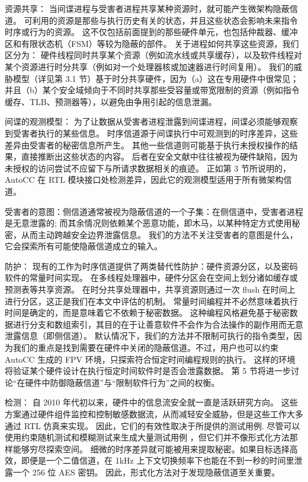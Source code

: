 资源共享： 当间谍进程与受害者进程共享某种资源时，就可能产生微架构隐蔽信道。
可利用的资源是那些与执行历史有关的状态，并且这些状态会影响未来指令时序或行为的资源。
这不仅包括前面提到的那些硬件单元，也包括仲裁器、缓冲区和有限状态机（FSM）等较为隐蔽的部件。
关于进程如何共享这些资源，我们区分为：
硬件线程同时共享某个资源（例如流水线或共享缓存），以及软件线程对某个资源进行时分共享（例如对一个处理器核或加速器进行时间复用）。
我们的威胁模型（详见第 3.1 节）基于时分共享硬件，因为（a）这在专用硬件中很常见；
并且（b）某个安全域倾向于不同时共享那些受容量或带宽限制的资源（例如指令缓存、TLB、预测器等），以避免由争用引起的信息泄漏。

间谍的观测模型： 为了让数据从受害者进程泄露到间谍进程，间谍必须能够观察到受害者执行的某些信息。
时序信道源于间谍执行中可观测到的时序差异，这些差异由受害者的秘密信息所产生。
其他一些信道则可能基于执行未授权操作的结果，直接推断出这些状态的内容。
后者在安全文献中往往被视为硬件缺陷，因为未授权的访问尝试不应留下与所请求数据相关的痕迹。
正如第 3 节所说明的，AutoCC 在 RTL 模块接口处检测差异，因此它的观测模型适用于所有微架构信道。

受害者的意图：侧信道通常被视为隐蔽信道的一个子集：在侧信道中，受害者进程是无意泄露的;
而其余情况则依赖某个恶意功能，即木马，以某种特定方式使用秘密，从而主动跨越安全边界泄露信息。
我们的方法不关注受害者的意图是什么，它会探索所有可能使隐蔽信道成立的输入。

防护： 现有的工作为时序信道提供了两类替代性防护：硬件资源分区，以及密码软件的常量时间实现。
在多线程处理器中，硬件分区会在空间上划分诸如缓存或预测表等共享资源。
在时分共享处理器中，共享资源则通过一次 flush 在时间上进行分区，这正是我们在本文中评估的机制。
常量时间编程并不必然意味着执行时间是确定的，而是意味着它不依赖于秘密数据。
这种编程风格避免基于秘密数据进行分支和数组索引，其目的在于让善意软件不会作为合法操作的副作用而无意泄露信息（即侧信道）。
默认情况下，我们的方法并不限制可执行的指令类型，因为我们的重点是找到需要在硬件中关闭的隐蔽信道。不过，用户也可以约束 AutoCC 生成的 FPV 环境，只探索符合恒定时间编程规则的执行。
这样的环境将验证某个硬件设计在执行恒定时间软件时是否会泄露数据。
第 5 节将进一步讨论“在硬件中防御隐蔽信道”与“限制软件行为”之间的权衡。

检测： 自 2010 年代初以来，硬件中的信息流安全就一直是活跃研究方向。
这些方案通过硬件组件监控和控制敏感数据流，从而减轻安全威胁，但是这些工作大多通过 RTL 仿真来实现。
因此，它们的有效性取决于所提供的测试用例.
尽管可以使用约束随机测试和模糊测试来生成大量测试用例 ，但它们并不像形式化方法那样能够穷尽探索空间。
细微的时序差异就可能被用来提取秘密。如果目标选择高效，即便是一个二值信道，在 1kHz 上下文切换频率下也能在不到一秒的时间里泄露一个 256 位 AES 密钥。
因此，形式化方法对于发现隐蔽信道至关重要。

